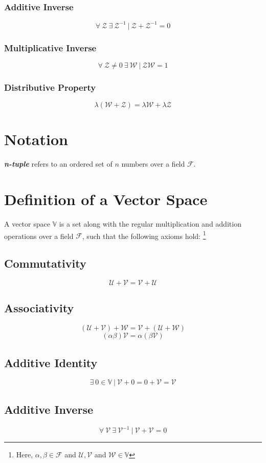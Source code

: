 \subsubsection{Additive Inverse}
$$\forall \ \mathcal{Z} \ \exists \ \mathcal{Z}^{-1} \ | \ \mathcal{Z} + \mathcal{Z}^{-1} = 0$$
\subsubsection{Multiplicative Inverse}
$$\forall \  \mathcal{Z} \neq 0 \ \exists \ \mathcal{W} \ | \ \mathcal{Z}\mathcal{W} = 1$$
\subsubsection{Distributive Property}
$$\lambda(\mathcal{W} + \mathcal{Z}) = \lambda\mathcal{W} + \lambda\mathcal{Z}$$
\section{Notation}
\textit{\textbf{n-tuple}} refers to an ordered set of $n$ numbers over a field $\mathcal{F}$.
\section{Definition of a Vector Space}
\label{sec: Sec 1.3}
A vector space $\mathbb{V}$ is a set along with the regular multiplication and addition operations over a field $\mathcal{F}$, such that the following axioms hold: \footnote{Here, $\alpha , \beta \in \mathcal{F}$ and $\mathcal{U}, \mathcal{V} $ and $\mathcal{W} \in \mathbb{V}$} \\
\subsection{Commutativity}
 $$\mathcal{U} + \mathcal{V} = \mathcal{V} + \mathcal{U}$$
\subsection{Associativity}
 $$(\mathcal{U} + \mathcal{V}) + \mathcal{W} = \mathcal{V} + (\mathcal{U} + \mathcal{W})$$
 $$(\alpha \beta) \mathcal{V} = \alpha (\beta \mathcal{V})$$
\subsection{Additive Identity}
$$\exists \  0 \in \mathbb{V} \ | \ \mathcal{V} + 0 = 0 + \mathcal{V} = \mathcal{V}$$
\subsection{Additive Inverse}
$$\forall \ \mathcal{V} \ \exists \ \mathcal{V}^{-1} \ | \ \mathcal{V} + \mathcal{V} = 0$$
